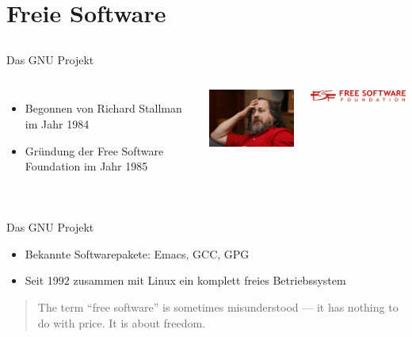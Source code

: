 \documentclass[12pt]{beamer}
\begin{document}
\subsection{}

\section{Freie Software}


\subsection{}
\begin{frame}{Das GNU Projekt}

\begin{columns}


\column{6cm}
\begin{itemize}
\item Begonnen von Richard Stallman im Jahr 1984 
\item Gründung der Free Software Foundation im Jahr 1985 
\end{itemize}

\column{7cm}


\begin{center}
\includegraphics[width=4.5cm]{img/stallman}
\par\end{center}


\begin{center}
\includegraphics[width=5cm]{img/logo-fsf}
\par\end{center}

\end{columns}
\end{frame}



\subsection{}
\begin{frame}{Das GNU Projekt}

\begin{itemize}
\item Bekannte Softwarepakete: Emacs, GCC, GPG 
\item Seit 1992 zusammen mit Linux ein komplett freies Betriebssystem \end{itemize}
\begin{quote}
\textquotedbl{}The term “free software” is sometimes misunderstood — it
has nothing to do with price. It is about freedom.\textquotedbl{} 
\end{quote}
\end{frame}
\end{document}
